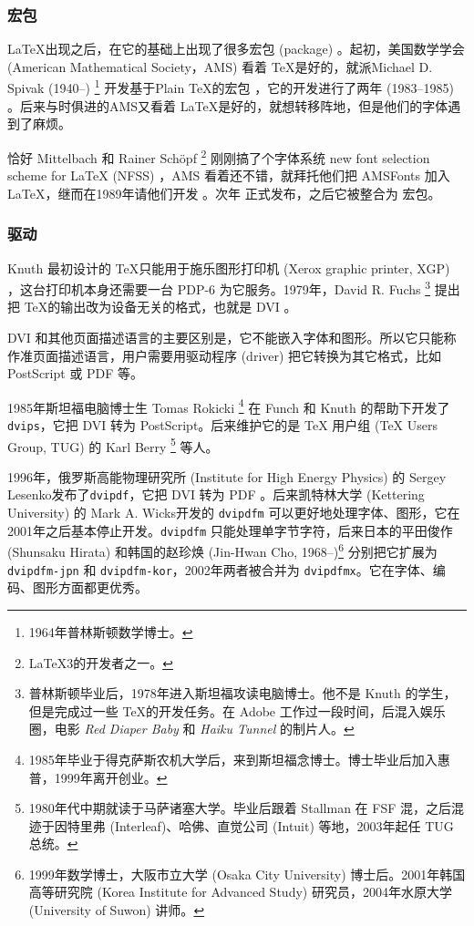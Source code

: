\subsubsection{宏包}

\LaTeX 出现之后，在它的基础上出现了很多宏包 (package) 。起初，美国数学学会 (American Mathematical Society，AMS)\indexAMS{} 看着 \TeX 是好的，就派Michael D. Spivak (1940--)\indexSpivak{} \footnote{1964年普林斯顿数学博士。} 开发基于Plain \TeX 的宏包 \AmSTeX，它的开发进行了两年 (1983--1985) 。后来与时俱进的AMS又看着 \LaTeX 是好的，就想转移阵地，但是他们的字体遇到了麻烦。

恰好 Mittelbach 和 Rainer Schöpf\indexSchopf{} \footnote{\LaTeX 3的开发者之一。} 刚刚搞了个字体系统 new font selection scheme for \LaTeX{} (NFSS) ，AMS 看着还不错，就拜托他们把 AMSFonts 加入 \LaTeX，继而在1989年请他们开发 \AmSLaTeX。次年 \AmSLaTeX 正式发布，之后它被整合为 \AmS 宏包。

\subsubsection{驱动}

Knuth 最初设计的 \TeX 只能用于施乐图形打印机 (Xerox graphic printer, XGP) ，这台打印机本身还需要一台 PDP-6 为它服务。1979年，David R. Fuchs\indexFuchs{} \footnote{普林斯顿毕业后，1978年进入斯坦福攻读电脑博士。他不是 Knuth 的学生，但是完成过一些 \TeX 的开发任务。在 Adobe 工作过一段时间，后混入娱乐圈，电影 \emph{Red Diaper Baby} 和 \emph{Haiku Tunnel} 的制片人。} 提出把 \TeX 的输出改为设备无关的格式，也就是 DVI 。

DVI 和其他页面描述语言的主要区别是，它不能嵌入字体和图形。所以它只能称作准页面描述语言，用户需要用驱动程序 (driver) 把它转换为其它格式，比如 PostScript 或 PDF 等。

1985年斯坦福电脑博士生 Tomas Rokicki\indexRokicki{} \footnote{1985年毕业于得克萨斯农机大学后，来到斯坦福念博士。博士毕业后加入惠普，1999年离开创业。} 在 Funch 和 Knuth 的帮助下开发了\texttt{dvips}，它把 DVI 转为 PostScript。后来维护它的是 TeX 用户组 (TeX Users Group, TUG)\indexTUG{} 的 Karl Berry\indexBerry{} \footnote{1980年代中期就读于马萨诸塞大学。毕业后跟着 Stallman 在 FSF 混，之后混迹于因特里弗 (Interleaf)、哈佛、直觉公司 (Intuit) 等地，2003年起任 TUG 总统。} 等人。

1996年，俄罗斯高能物理研究所 (Institute for High Energy Physics) 的 Sergey Lesenko\indexLesenko 发布了\texttt{dvipdf}，它把 DVI 转为 PDF 。后来凯特林大学 (Kettering University) 的 Mark A. Wicks\indexWicks 开发的 \texttt{dvipdfm} 可以更好地处理字体、图形，它在2001年之后基本停止开发。\texttt{dvipdfm} 只能处理单字节字符，后来日本的平田俊作 (Shunsaku Hirata)\indexHirata{} 和韩国的赵珍焕 (Jin-Hwan Cho, 1968--)\indexCho{}\footnote{1999年数学博士，大阪市立大学 (Osaka City University) 博士后。2001年韩国高等研究院 (Korea Institute for Advanced Study) 研究员，2004年水原大学 (University of Suwon) 讲师。} 分别把它扩展为 \texttt{dvipdfm-jpn} 和 \texttt{dvipdfm-kor}，2002年两者被合并为 \texttt{dvipdfmx}。它在字体、编码、图形方面都更优秀。

